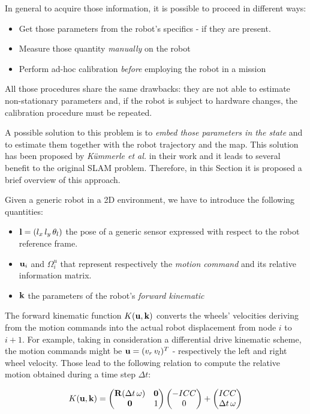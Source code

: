 In general to acquire those information, it is possible to proceed in different ways:

\begin{itemize}
    \item Get those parameters from the robot's specifics - if they are present.
    \item Measure those quantity \textit{manually} on the robot
    \item Perform ad-hoc calibration \textit{before} employing the robot in a mission
\end{itemize}

\noindent All those procedures share the same drawbacks: they are not able to estimate non-stationary parameters and, if the robot is subject to hardware changes, the calibration procedure must be repeated. 

A possible solution to this problem is to \textit{embed those parameters in the state} and to estimate  them together with the robot trajectory and the map. This solution has been proposed by \textit{K\"ummerle et al.} in their work \cite{kummerle2011sclam} and it leads to several benefit to the original SLAM problem. Therefore, in this Section it is proposed a brief overview of this approach.

Given a generic robot in a 2D environment, we have to introduce the following quantities:

\begin{itemize}
    \item $\mathbf{l} = (l_x \, l_y \, \theta_l)$ the pose of a generic sensor expressed with respect to the robot reference frame.
    \item $\mathbf{u}_i$ and $\Omega_i^u$ that represent respectively the \textit{motion command} and its relative information matrix.
    \item $\mathbf{k}$ the parameters of the robot's \textit{forward kinematic} 
\end{itemize}

The forward kinematic function $K(\mathbf{u}, \mathbf{k})$ converts the wheels' velocities deriving from the motion commands into the actual robot displacement from node $i$ to $i+1$. For example, taking in consideration a differential drive kinematic scheme, the motion commands might be $\mathbf{u} = (v_r \, v_l)^T$ - respectively the left and right wheel velocity. Those lead to the following relation to compute the relative motion obtained during a time step $\Delta t$:

\begin{equation}
    \label{eq:dd_kinematics}
    K(\mathbf{u}, \mathbf{k}) = 
        \begin{pmatrix}
            \mathbf{R}(\Delta t \, \omega) & \mathbf{0} \\
            \mathbf{0} & 1
        \end{pmatrix}
        \begin{pmatrix}
            -ICC \\ 0
        \end{pmatrix}
        +
        \begin{pmatrix}
            ICC \\ \Delta t \, \omega
        \end{pmatrix}
\end{equation}

